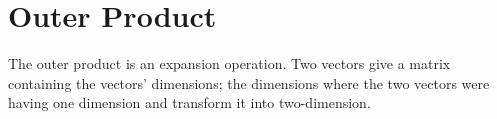 \chapter{Outer Product}

The outer product is an expansion operation. 
Two vectors give a matrix containing the vectors' dimensions; 
the dimensions where the two vectors were having one dimension and transform it into two-dimension.


